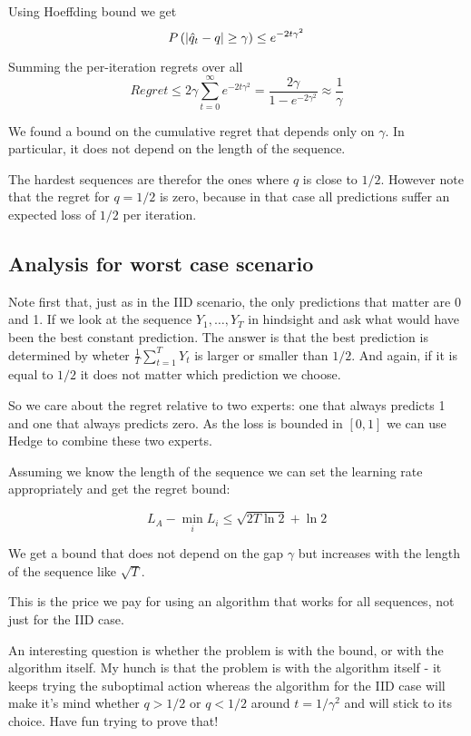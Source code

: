 \documentclass[12pt]{article}
\begin{document}
Using Hoeffding bound we get
\[
  P\left( |\hat{q}_t-q| \geq \gamma \right) \leq e^{-2 t \gamma^2}
\]

Summing the per-iteration regrets over all 
\[
  Regret \leq 2\gamma \sum_{t=0}^\infty  e^{-2 t \gamma^2} = \frac{2
    \gamma}{1-e^{-2 \gamma^2}} \approx \frac{1}{\gamma}
\]

We found a bound on the cumulative regret that depends only on
$\gamma$. In particular, it does not depend on the length of the sequence.

The hardest sequences are therefor the ones where $q$ is close to
$1/2$.  However note that the regret for $q=1/2$ is zero, because in
that case all predictions suffer an expected loss of $1/2$ per iteration.

\subsection{Analysis for worst case scenario}

Note first that, just as in the IID scenario, the only predictions
that matter are 0 and 1.  If we look at the sequence $Y_1,\ldots,Y_T$
in hindsight and ask what would have been the best constant
prediction. The answer is that the best prediction is determined by
wheter $\frac{1}{T}\sum_{t=1}^T Y_t$ is larger or smaller than
$1/2$. And again, if it is equal to $1/2$ it does not matter which
prediction we choose.

So we care about the regret relative to two experts: one that always
predicts 1 and one that always predicts zero. As the loss is bounded
in $[0,1]$ we can use Hedge to combine these two experts.

Assuming we know the length of the sequence we can set the learning
rate appropriately and get the regret bound:

\[ L_A - \min_i L_i  \leq \sqrt{2T\ln 2}+\ln 2 \]

We get a bound that does not depend on the gap $\gamma$ but increases
with the length of the sequence like $\sqrt{T}$.

This is the price we pay for using an algorithm that works for all
sequences, not just for the IID case.

An interesting question is whether the problem is with the bound, or
with the algorithm itself. My hunch is that the problem is with the
algorithm itself - it keeps trying the suboptimal action whereas the
algorithm for the IID case will make it's mind whether $q>1/2$ or
$q<1/2$ around $t = 1/\gamma^2$ and will stick to its choice. Have fun
trying to prove that!
\end{document}
